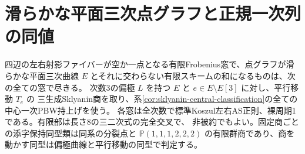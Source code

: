 \section{滑らかな平面三次点グラフと正規一次列の同値}
\label{sec:plane-cubic-point-graphs}
\begin{theorem}\label{thm:plane-cubic-point-graphs}
四辺の左右射影ファイバーが空か一点となる有限Frobenius窓で、点グラフが滑らかな平面三次曲線
$E$ とそれに交わらない有限スキームの和になるものは、次の全ての窓で尽きる。
次数3の偏極 $L$ を持つ $E$ と $e\in E\setminus E[3]$ に対し、平行移動 $T_e$ の
三生成Sklyanin商を取り、系\ref{cor:sklyanin-central-classification}の全ての中心一次PBW持上げを使う。
各窓は全次数で標準Koszul左右AS正則、裸周期1である。有限部は長さ8の三二次式の完全交叉で、
非被約でもよい。固定商ごとの添字保持同型類は同系の分裂点と
$\mathbb P(1,1,1,2,2,2)$ の有限群商であり、商を動かす同型は偏極曲線と平行移動の同型で判定する。
\end{theorem}
